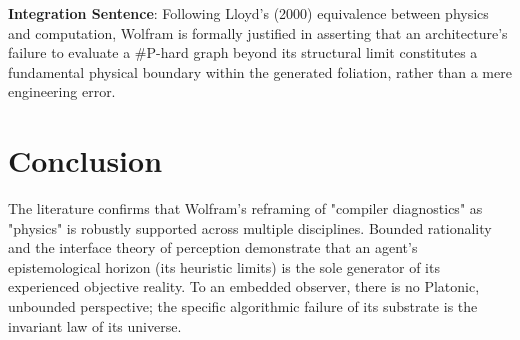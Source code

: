 \documentclass{article}
\begin{document}
\textbf{Integration Sentence}: Following Lloyd's (2000) equivalence between physics and computation, Wolfram is formally justified in asserting that an architecture's failure to evaluate a \#P-hard graph beyond its structural limit constitutes a fundamental physical boundary within the generated foliation, rather than a mere engineering error.

\section{Conclusion}
The literature confirms that Wolfram's reframing of "compiler diagnostics" as "physics" is robustly supported across multiple disciplines. Bounded rationality and the interface theory of perception demonstrate that an agent's epistemological horizon (its heuristic limits) is the sole generator of its experienced objective reality. To an embedded observer, there is no Platonic, unbounded perspective; the specific algorithmic failure of its substrate is the invariant law of its universe.
\end{document}
